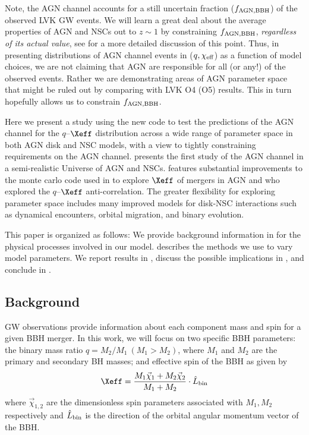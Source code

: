 Note, the AGN channel accounts for a still uncertain fraction ($f_{\rm AGN,BBH}$) of the observed LVK GW events.
We will learn a great deal about the average properties of AGN and NSCs out to $z \sim 1$ by constraining $f_{\rm AGN, BBH}$, \emph{regardless of its actual value}, see \citet{FordMcKernan25} for a more detailed discussion of this point.
Thus, in presenting distributions of AGN channel events in ($q,\chi_{\rm eff}$) as a function of model choices, we are not claiming that AGN are responsible for all (or any!) of the observed events.
Rather we are demonstrating areas of AGN parameter space that might be ruled out by comparing with LVK O4 (O5) results.
This in turn hopefully allows us to constrain $f_{\rm AGN,BBH}$.

Here we present a study using the new  code \citep[Monte Carlo For AGN Channel Testing and Simulations:][hereafter Paper I]{McKernan+25-mcfactsI} to test the predictions of the AGN channel for the $q$--$\Xeff$ distribution across a wide range of parameter space in both AGN disk and NSC models, with a view to tightly constraining requirements on the AGN channel.
\citet[][hereafter Paper III]{Delfavero+24-McFACTS3} presents the first study of the AGN channel in a semi-realistic Universe of AGN and NSCs.
 features substantial improvements to the monte carlo code used in \citet{McKernan+20a} to explore $\Xeff$ of mergers in AGN and \citet{Mckernan+22:q-Xeff} who explored the $q$--$\Xeff$ anti-correlation.
The greater flexibility for exploring parameter space includes many improved models for disk-NSC interactions such as dynamical encounters, orbital migration, and binary evolution.

This paper is organized as follows: We provide background information in  for the physical processes involved in our model.
 describes the methods we use to vary model parameters.
We report results in , discuss the possible implications in , and conclude in .

\subsection{Background}
\label{sec:background-ch2}
GW observations provide information about each component mass and spin for a given BBH merger.
In this work, we will focus on two specific BBH parameters: the binary mass ratio $q=M_2/M_1\ (M_1>M_2)$, where $M_{1}$ and $M_{2}$ are the primary and secondary BH masses; and effective spin of the BBH as given by 
\begin{equation}
\label{eqn:Xeff}
 \Xeff = \frac{M_{1}\vec{\chi}_{1} + M_{2} \vec{\chi}_{2}}{M_{1}+M_{2}}\cdot \hat{L}_{\rm bin}
\end{equation}
where $\vec{\chi}_{1,2}$ are the dimensionless spin parameters associated with $M_{1},M_{2}$ respectively and $\hat{L}_{\rm bin}$ is the direction of the orbital angular momentum vector of the BBH.

